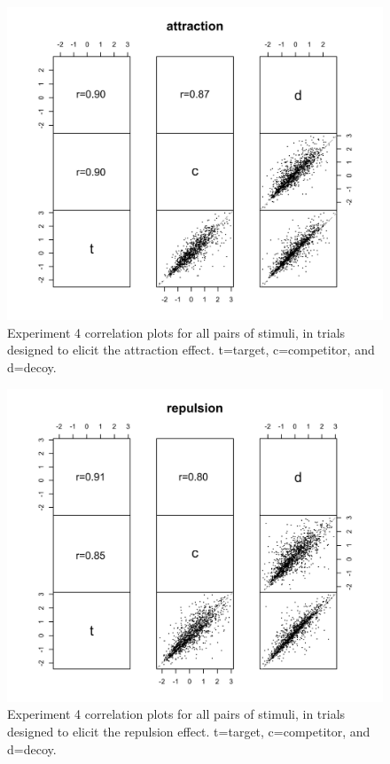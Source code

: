 \begin{figure}
    \includegraphics[scale=.5,width=120mm]{figures/price_z_corplot_attraction.jpeg}
    \caption{Experiment 4 correlation plots for all pairs of stimuli, in trials designed to elicit the attraction effect. t=target, c=competitor, and d=decoy.}
    \label{fig:price_z_corplot_attraction}
\end{figure}

\begin{figure}
    \includegraphics[scale=.5,width=120mm]{figures/price_z_corplot_repulsion.jpeg}
    \caption{Experiment 4 correlation plots for all pairs of stimuli, in trials designed to elicit the repulsion effect. t=target, c=competitor, and d=decoy.}
    \label{fig:price_z_corplot_repulsion}
\end{figure}

